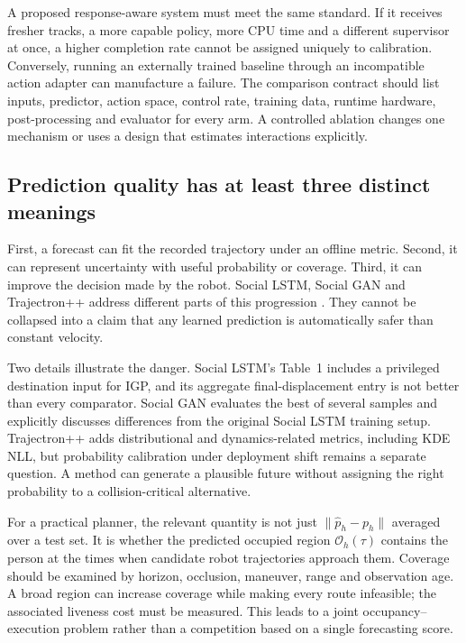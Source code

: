 A proposed response-aware system must meet the same standard. If it receives
fresher tracks, a more capable policy, more CPU time and a different supervisor
at once, a higher completion rate cannot be assigned uniquely to calibration.
Conversely, running an externally trained baseline through an incompatible
action adapter can manufacture a failure. The comparison contract should list
inputs, predictor, action space, control rate, training data, runtime hardware,
post-processing and evaluator for every arm. A controlled ablation changes one
mechanism or uses a design that estimates interactions explicitly.

\subsection{Prediction quality has at least three distinct meanings}
First, a forecast can fit the recorded trajectory under an offline metric.
Second, it can represent uncertainty with useful probability or coverage.
Third, it can improve the decision made by the robot. Social LSTM, Social GAN
and Trajectron++ address different parts of this progression
\citep{sociallstm,socialgan,trajectron}. They cannot be collapsed into a claim
that any learned prediction is automatically safer than constant velocity.

Two details illustrate the danger. Social LSTM's Table~1 includes a privileged
destination input for IGP, and its aggregate final-displacement entry is not
better than every comparator. Social GAN evaluates the best of several samples
and explicitly discusses differences from the original Social LSTM training
setup. Trajectron++ adds distributional and dynamics-related metrics, including
KDE NLL, but probability calibration under deployment shift remains a separate
question. A method can generate a plausible future without assigning the right
probability to a collision-critical alternative.

For a practical planner, the relevant quantity is not just
$\|\hat p_h-p_h\|$ averaged over a test set. It is whether the predicted
occupied region $\mathcal{O}_h(\tau)$ contains the person at the times when
candidate robot trajectories approach them. Coverage should be examined by
horizon, occlusion, maneuver, range and observation age. A broad region can
increase coverage while making every route infeasible; the associated liveness
cost must be measured. This leads to a joint occupancy--execution problem rather
than a competition based on a single forecasting score.


